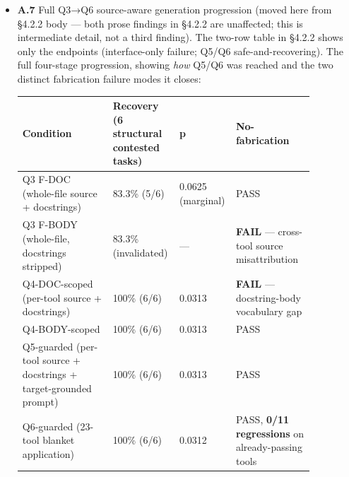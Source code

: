 \begin{itemize}
  \begin{itemize}
  \tightlist
  \item
    \textbf{v1} --- star-stratified GitHub-topic pool.
  \item
    \textbf{v2} --- doc-density-stratified, N=23.
  \item
    \textbf{v3--v4} --- three, then a fourth, confirmed
    Python-AST-extractor bug found and fixed while preparing the trial
    batch.
  \item
    \textbf{v5 (final, ratified)} --- a systematic audit found that the
    generic regex fallback used for every non-Python server pulls in
    systemic noise (template literals, parameter names, category labels,
    unrelated example data) --- a capability limit of blind
    text-proximity matching, not a fixable parsing bug. All 11
    non-Python servers were dropped, yielding the final N=10,
    Python-only frame reported in §5.2. Full commit-level trail:
    \texttt{STATUS.md} EXP-1 section, ``Frame history'' paragraph;
    ratification commit \texttt{538affe};
    \url{https://github.com/gaurav-gandhi-2411/agentgauge/blob/a78462f/docs/paper/evidence_table.md}
    §2.
  \end{itemize}
\item
  \textbf{A.7} Full Q3→Q6 source-aware generation progression (moved
  here from §4.2.2 body --- both prose
  findings in §4.2.2 are unaffected; this is intermediate detail, not a
  third finding). The two-row table in §4.2.2 shows only the endpoints
  (interface-only failure; Q5/Q6 safe-and-recovering). The full
  four-stage progression, showing \emph{how} Q5/Q6 was reached and the
  two distinct fabrication failure modes it closes:

  \renewcommand{\arraystretch}{1.15}
  \begin{longtable}{@{}p{0.30\linewidth}p{0.19\linewidth}p{0.11\linewidth}p{0.26\linewidth}@{}}
  \toprule
  \textbf{Condition} & \textbf{Recovery (6 structural contested tasks)} & \textbf{p} &
  \textbf{No-fabrication} \\
  \midrule
  \endhead
  Q3 F-DOC (whole-file source + docstrings) & 83.3\% (5/6) & 0.0625
  (marginal) & PASS \\
  Q3 F-BODY (whole-file, docstrings stripped) & 83.3\% (invalidated) &
  --- & \textbf{FAIL} --- cross-tool source misattribution \\
  Q4-DOC-scoped (per-tool source + docstrings) & 100\% (6/6) & 0.0313 &
  \textbf{FAIL} --- docstring-body vocabulary gap \\
  Q4-BODY-scoped & 100\% (6/6) & 0.0313 & PASS \\
  Q5-guarded (per-tool source + docstrings + target-grounded prompt) &
  100\% (6/6) & 0.0313 & PASS \\
  Q6-guarded (23-tool blanket application) & 100\% (6/6) & 0.0312 &
  PASS, \textbf{0/11 regressions} on already-passing tools \\
  \bottomrule
  \end{longtable}
  \renewcommand{\arraystretch}{1}


\end{itemize}
